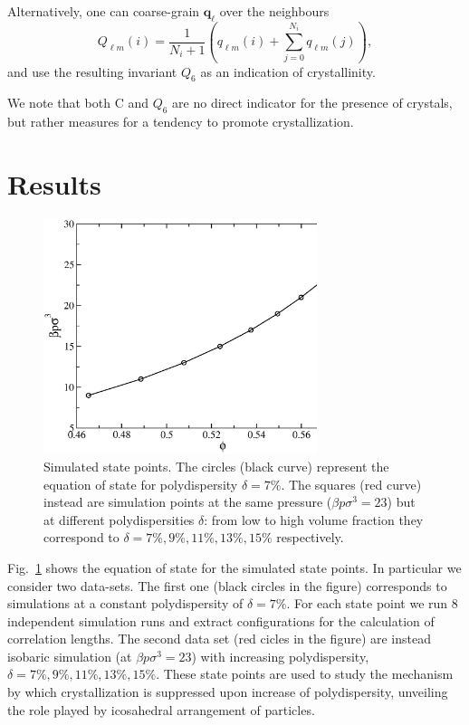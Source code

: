 \documentclass[twocolumn,superscriptaddress]{revtex4-1}
\begin{document}
Alternatively, one can coarse-grain $\mathbf{q}_\ell$ over the neighbours~\cite{Lechner2008}
\begin{equation}
	Q_{\ell m}(i) = \frac{1}{N_i+1}\left( q_{\ell m}(i) +  \sum_{j=0}^{N_i} q_{\ell m}(j)\right), 
	\label{eq:Qlm}
\end{equation}
and use the resulting invariant $Q_6$ as an indication of crystallinity.

We note that both $\text{C}$ and $Q_6$ are no direct indicator for the presence of crystals, but rather measures for a tendency to promote crystallization.

\section{Results}

\begin{figure}
 \centering
 \includegraphics[width=8cm]{./figures/eos.eps}
 \caption{Simulated state points. The circles (black curve) represent the equation of state
for polydispersity $\delta=7\%$. The squares (red curve) instead are simulation points at the same
pressure ($\beta p\sigma^3=23$) but at different polydispersities $\delta$: from low to high
volume fraction they correspond to $\delta=7\%,9\%,11\%,13\%,15\%$ respectively.}
 \label{fig:eos}
\end{figure}


Fig.~\ref{fig:eos} shows the equation of state for the simulated state points. In particular
we consider two data-sets. The first one (black circles in the figure) corresponds to
simulations at a constant polydispersity of $\delta=7\%$. For each state point we run $8$ independent
simulation runs and extract configurations for the calculation of correlation lengths.
The second data set (red cicles in the figure) are instead isobaric simulation (at $\beta p\sigma^3=23$)
with increasing polydispersity, $\delta=7\%,9\%,11\%,13\%,15\%$. These state points are used to study
the mechanism by which crystallization is suppressed upon increase of polydispersity, unveiling the
role played by icosahedral arrangement of particles.
\end{document}
